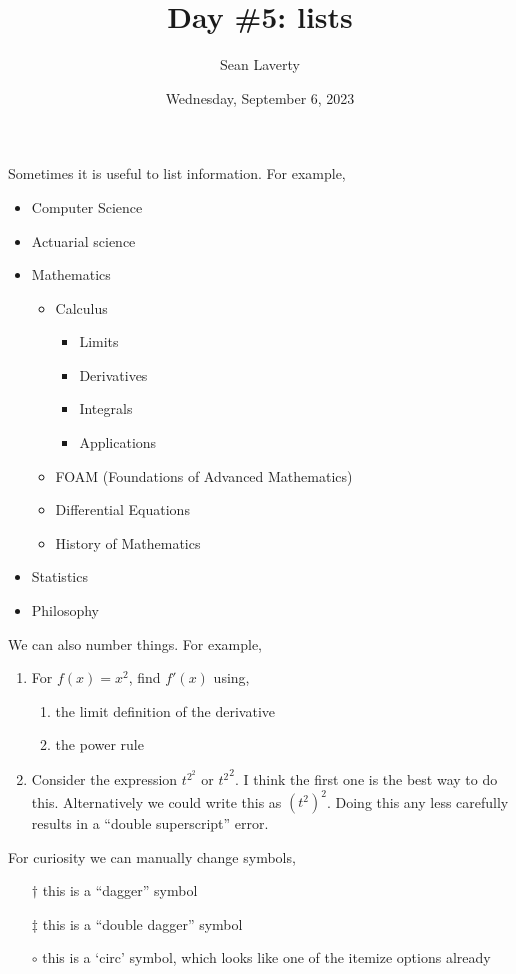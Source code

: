 \documentclass[12pt]{article}
\title{Day \#5: lists}
\author{Sean Laverty}
\date{Wednesday, September 6, 2023}
\begin{document}
\maketitle
\newpage

Sometimes it is useful to list information. For example,
\begin{itemize}
\item Computer Science
\item Actuarial science
\item Mathematics
\begin{itemize}
\item Calculus
\begin{itemize}
\item Limits
\item Derivatives
\item Integrals
\item Applications
\end{itemize}
\item FOAM (Foundations of Advanced Mathematics)
\item Differential Equations
\item History of Mathematics
\end{itemize}

\item Statistics
\item Philosophy
\end{itemize}


\newpage
We can also number things. For example,
\begin{enumerate}
\item For \(f(x) = x^{2}\), find \(f'(x)\) using,
\begin{enumerate}
\item the limit definition of the derivative
\item the power rule
\end{enumerate}
\item Consider the expression \(t^{2^{2}}\) or \({t^2}^{2}\).  I think the first one is the best way to do this. Alternatively we could write this as \((t^{2})^{2}\).  Doing this any less carefully results in a ``double superscript'' error.
\end{enumerate}

\newpage
For curiosity we can manually change symbols,
\begin{itemize}
\item[\(\dagger\)] this is a ``dagger'' symbol
\item[\(\ddagger\)] this is a ``double dagger'' symbol
\item[\(\circ\)] this is a `circ' symbol, which looks like one of the itemize options already
\end{itemize}
\end{document}
